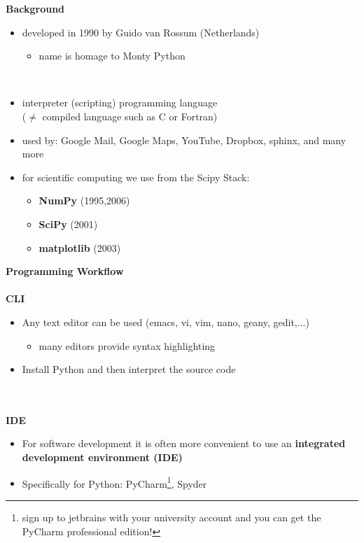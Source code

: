%
%
\begin{frame}[c]
\textbf{\large Background}
\Vspace{0.5cm}
\begin{minipage}{0.7\textwidth}
	
\begin{itemize}	
	\item
	developed in 1990 by Guido van Rossum (Netherlands)	
	\begin{itemize}	
		\item
		name is homage to Monty Python
	\end{itemize}
	~\\\item
	interpreter (scripting) programming language\\ ($\neq$
	compiled language such as C or Fortran)
	~\\[0.7cm]\item
	used by: Google Mail, Google Maps, YouTube, Dropbox, sphinx, and many more
	~\\[0.7cm]\item
	for scientific computing we use from the Scipy Stack:
	\begin{itemize}
		\item \textbf{NumPy} (1995,2006)
		\item \textbf{SciPy} (2001)
		\item \textbf{matplotlib} (2003)
	\end{itemize} 
\end{itemize}
\end{minipage}
\end{frame}


%
%
\begin{frame}[c]
\textbf{\large Programming Workflow}
~\\~\\
\textbf{CLI} 

\begin{itemize}
	
	\item Any text editor can be used (emacs, vi, vim, nano, geany,
	gedit,...)
	\begin{itemize}
		\item many editors provide syntax highlighting
	\end{itemize}
	\item Install Python and then interpret the source code
\end{itemize}
~\\~\\
	\textbf{IDE} 
\begin{itemize}
	\item For software development it is often more convenient to use an
\textbf{integrated development environment (IDE)}
	\item Specifically for Python: PyCharm\footnote{sign up to jetbrains with your university
	account and you can get the PyCharm professional edition!}, Spyder
\end{itemize}
\end{frame}

